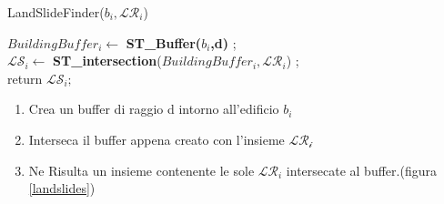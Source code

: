 \begin{algorithm}[H]
	
	\IncMargin{1em}
	\caption{LandSlideFinder($b_i , \mathcal{LR}_i $) }
	\label{alg:four}
	\BlankLine
	\SetAlgoNoLine
	$ BuildingBuffer_i  \leftarrow $ \textbf{ST\_Buffer($b_i$,d)} ;\\
	$ \mathcal{LS}_i \leftarrow $ \textbf{ST\_intersection}($BuildingBuffer_i,\mathcal{LR}_i $) ;\\
	return $\mathcal{LS}_i;$
\end{algorithm}

\begin{enumerate}
	\item Crea un buffer di raggio d intorno all'edificio $b_i$
	\item Interseca il buffer appena creato con l'insieme  $\mathcal{LR_i}$
	\item Ne Risulta un insieme contenente le sole $\mathcal{LR}_i$ intersecate al buffer.(figura \ref{landslides}) 
\end{enumerate}

